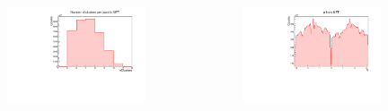 \documentclass[10pt]{beamer}
\begin{document}
\begin{frame}
\begin{columns}
\begin{column}{0.5\textwidth}
\begin{figure}
\begin{center}
                    \includegraphics[width=0.95\textwidth]{Plots/pass4_MFT/nClusters_pass4.pdf}
                \end{center}
            \end{figure}
        \end{column}
        \begin{column}{0.5\textwidth}
            \vspace*{-0.43cm}
            \begin{figure}
                \begin{center}
                    \includegraphics[width=0.95\textwidth]{Plots/pass4_MFT/phi_pass4.pdf}
                \end{center}
            \end{figure}
            \vspace*{-0.6cm}
            \begin{figure}

\end{figure}
\end{column}
\end{columns}
\end{frame}
\end{document}

